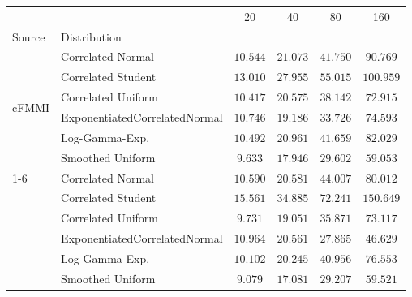 \begin{tabular}{llcccc}
\toprule
 &  & 20 & 40 & 80 & 160 \\
Source & Distribution &  &  &  &  \\
\midrule
\multirow[l]{6}{*}{cFMMI} & Correlated Normal & $ 10.544 $ & $ 21.073 $ & $ 41.750 $ & $ 90.769 $ \\
 & Correlated Student & $ 13.010 $ & $ 27.955 $ & $ 55.015 $ & $ 100.959 $ \\
 & Correlated Uniform & $ 10.417 $ & $ 20.575 $ & $ 38.142 $ & $ 72.915 $ \\
 & ExponentiatedCorrelatedNormal & $ 10.746 $ & $ 19.186 $ & $ 33.726 $ & $ 74.593 $ \\
 & Log-Gamma-Exp. & $ 10.492 $ & $ 20.961 $ & $ 41.659 $ & $ 82.029 $ \\
 & Smoothed Uniform & $ 9.633 $ & $ 17.946 $ & $ 29.602 $ & $ 59.053 $ \\
\cmidrule{1-6}
\multirow[l]{6}{*}{jFMMI} & Correlated Normal & $ 10.590 $ & $ 20.581 $ & $ 44.007 $ & $ 80.012 $ \\
 & Correlated Student & $ 15.561 $ & $ 34.885 $ & $ 72.241 $ & $ 150.649 $ \\
 & Correlated Uniform & $ 9.731 $ & $ 19.051 $ & $ 35.871 $ & $ 73.117 $ \\
 & ExponentiatedCorrelatedNormal & $ 10.964 $ & $ 20.561 $ & $ 27.865 $ & $ 46.629 $ \\
 & Log-Gamma-Exp. & $ 10.102 $ & $ 20.245 $ & $ 40.956 $ & $ 76.553 $ \\
 & Smoothed Uniform & $ 9.079 $ & $ 17.081 $ & $ 29.207 $ & $ 59.521 $ \\
\bottomrule
\end{tabular}
